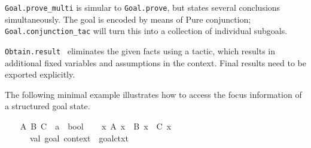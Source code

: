 \begin{isabellebody}
\begin{isamarkuptext}
\begin{description}
  \item \verb|Goal.prove_multi| is simular to \verb|Goal.prove|, but
  states several conclusions simultaneously.  The goal is encoded by
  means of Pure conjunction; \verb|Goal.conjunction_tac| will turn this
  into a collection of individual subgoals.

  \item \verb|Obtain.result|~ eliminates the
  given facts using a tactic, which results in additional fixed
  variables and assumptions in the context.  Final results need to be
  exported explicitly.

  \end{description}%
\end{isamarkuptext}%
\isamarkuptrue%
%
\endisatagmlref
{\isafoldmlref}%
%
\isadelimmlref
%
\endisadelimmlref
%
\isadelimmlex
%
\endisadelimmlex
%
\isatagmlex
%
\begin{isamarkuptext}%
The following minimal example illustrates how to access
  the focus information of a structured goal state.%
\end{isamarkuptext}%
\isamarkuptrue%
%
\endisatagmlex
{\isafoldmlex}%
%
\isadelimmlex
%
\endisadelimmlex
{}\isamarkupfalse%
\isanewline
{}\isanewline
%
\isadelimproof
\ \ %
\endisadelimproof
%
\isatagproof
{}\isamarkupfalse%
\ A\ B\ C\ {}{}\ {}{}a\ {}\ bool{}\isanewline
\isanewline
\ \ \isamarkupfalse%
\ {}{}x{}\ A\ x\ {}\ B\ x\ {}\ C\ x{}%
\endisatagproof
{\isafoldproof}%
%
\isadelimproof
\isanewline
%
\endisadelimproof
%
\isadelimML
\ \ \ \ %
\endisadelimML
%
\isatagML
{}\isamarkupfalse%
\isanewline
\ \ \ \ {}\isanewline
\ \ \ \ \ \ val\ {}goal{}\ context\ {}\ goal{}ctxt{}\ {}{}{}{}\ {}\ %

\end{isabellebody}
